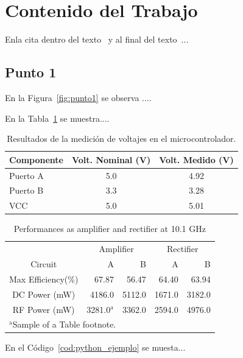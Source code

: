\section{Contenido del Trabajo}

\lipsum[4]

Enla cita dentro del texto~\textcite{Wolf2017} y al final del texto~\parencite{Margolis2020}...

\subsection{Punto 1}

\lipsum[5]

En la Figura~\ref{fig:punto1} se observa ....


\lipsum[6]

En la Tabla~\ref{tab:voltajes} se muestra....

\begin{table}[]
    \centering
    \caption{Resultados de la medición de voltajes en el microcontrolador.}
    \label{tab:voltajes}
    \begin{tabular}{@{} lcc @{}} %
        \toprule
        \textbf{Componente} & \textbf{Volt. Nominal (V)} & \textbf{Volt. Medido (V)} \\ \midrule
        Puerto A            & 5.0                          & 4.92                        \\
        Puerto B            & 3.3                          & 3.28                        \\
        VCC                 & 5.0                          & 5.01                        \\ \bottomrule
    \end{tabular}
\end{table}

\lipsum[7]

\begin{table}[ht] 
\caption{Performances as amplifier and rectifier at 10.1 GHz} %
\centering %
\begin{tabular}{c rr  rr  } %
\toprule
 &\multicolumn{2}{c}{Amplifier} & \multicolumn{2}{c}{Rectifier}\\  
Circuit &A&B&A&B\\ [0.25ex] 
\midrule
Max Efficiency(\%) & 67.87 & 56.47 & 64.40 & 63.94 \\  
DC Power (mW) & 4186.0 & 5112.0 & 1671.0 & 3182.0\\ 
RF Power (mW) & 3281.0$^{\mathrm{a}}$ & 3362.0 & 2594.0 & 4976.0\\  
\bottomrule
\multicolumn{5}{l}{$^{\mathrm{a}}$Sample of a Table footnote.}
\end{tabular} 
\label{tab:hresult} 
\end{table} 


En el Código~\ref{cod:python_ejemplo} se muesta...



\lipsum
